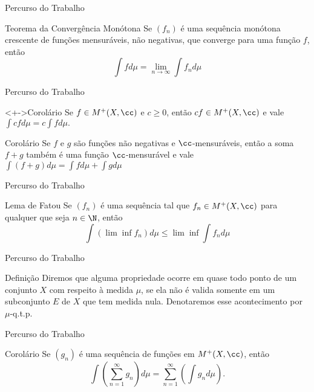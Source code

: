 	\begin{frame}{Percurso do Trabalho}
		\begin{block}{Teorema da Convergência Monótona}
			\justify Se $(f_n)$ é uma sequência monótona crescente de funções mensuráveis, não negativas, que converge para uma função $f$, então
			$$ \displaystyle
			\int f d\mu = \lim_{n \to \infty} \int f_n d\mu
			$$
		\end{block}
	\end{frame}
	\begin{frame}{Percurso do Trabalho}
		\begin{block}<+->{Corolário}
			\justify Se $f \in M^+(X, \cc)$ e $c \geq 0$, então $cf \in M^+(X, \cc)$ e vale
			$ \displaystyle
			\int cf d\mu = c\int f d\mu.
			$	
		\end{block}
		\begin{block}{Corolário}
			\justify Se $f$ e $g$ são funções não negativas e $\cc$-mensuráveis, então  a soma $f + g$ também é uma função $\cc$-mensurável e vale
			$ \displaystyle
			\int (f + g) d\mu = \int f d\mu + \int g d\mu
			$
		\end{block}
	\end{frame}
	
	\begin{frame}{Percurso do Trabalho}
		\begin{block}{Lema de Fatou}
			\justify Se $(f_n)$ é uma sequência tal que $f_n \in M^+(X, \cc)$ para qualquer que seja $n \in \N$, então 
			$$\displaystyle
			\int(\lim \inf f_n)d\mu \leq \lim \inf \int f_n d\mu$$
		\end{block}
	\end{frame}
	
	\begin{frame}{Percurso do Trabalho}
		\begin{block}{Definição}
				\justify Diremos que alguma propriedade ocorre em quase todo ponto de um conjunto $X$ com respeito à medida $\mu$, se ela não é valida somente em um subconjunto $E$ de $X$ que tem medida nula.
			Denotaremos esse acontecimento por $\mu$-q.t.p.
		\end{block}
	\end{frame}

	\begin{frame}{Percurso do Trabalho}
		\begin{block}{Corolário}
			\justify Se $(g_n)$ é uma sequência de funções em $M^+(X, \cc)$, então 
			$$
			\int \left(\sum_{n = 1} ^\infty g_n\right)d\mu
			=
			\sum_{n = 1} ^\infty \left(\int g_n d\mu\right).
			$$
		\end{block}
	\end{frame}

